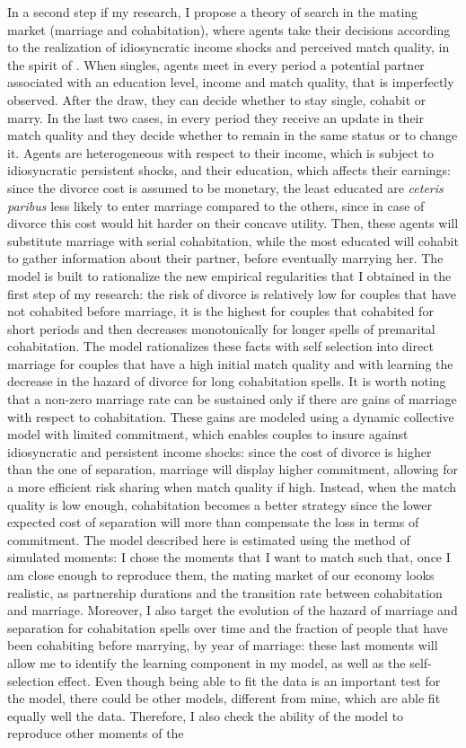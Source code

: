\documentclass[12pt]{article}
\begin{document}
{   In a second step if my research, I propose a theory of search in the mating market (marriage and cohabitation), where agents take their decisions according to the realization of idiosyncratic income shocks and perceived match quality, in the spirit of \citet{jovanovic1979}. When singles, agents meet in every period a potential partner associated with an education level, income and match quality, that is imperfectly observed. After the draw, they can decide whether to stay single, cohabit or marry. In the last two cases, in every period they receive an update in their match quality and they decide whether to remain in the same status or to change it. Agents are heterogeneous with respect to their income, which is subject to idiosyncratic persistent shocks, and their education, which affects their earnings: since the divorce cost is assumed to be monetary, the least educated are \textit{ceteris paribus} less likely to enter marriage compared to the others, since in case of divorce this cost would hit harder on their concave utility. Then, these agents will substitute marriage with serial cohabitation, while the most educated will cohabit to gather information about their partner, before eventually marrying her. The model is built to rationalize the new empirical regularities that I obtained in the first step of my research: the risk of divorce is relatively low for couples that have not cohabited before marriage, it is the highest for couples that cohabited for short periods and then decreases monotonically for longer spells of premarital cohabitation. The model rationalizes these facts with self selection into direct marriage for couples that have a high initial match quality and with learning the decrease in the hazard of divorce for long cohabitation spells. It is worth noting that a non-zero marriage rate can be sustained only if there are gains of marriage with respect to cohabitation. These gains are modeled using a dynamic collective model with limited commitment, which enables couples to insure against idiosyncratic and persistent income shocks: since the cost of divorce is higher than the one of separation, marriage will display higher commitment, allowing for a more efficient risk sharing when match quality if high. Instead, when the match quality is low enough, cohabitation becomes a better strategy since the lower expected cost of separation will more than compensate the loss in terms of commitment. The model described here is estimated using the method of simulated moments: I chose the moments that I want to match such that, once I am close enough to reproduce them, the mating market of our economy looks realistic, as partnership durations and the transition rate between cohabitation and marriage. Moreover, I also target the evolution of the hazard of marriage and separation for cohabitation spells over time and the fraction of people that have been cohabiting before marrying, by year of marriage: these last moments will allow me to identify the learning component in my model, as well as the self-selection effect. Even though being able to fit the data is an important test for the model, there could be other models, different from mine, which are able fit equally well the data. Therefore, I also check the ability of the model to reproduce other moments of the }
\end{document}
